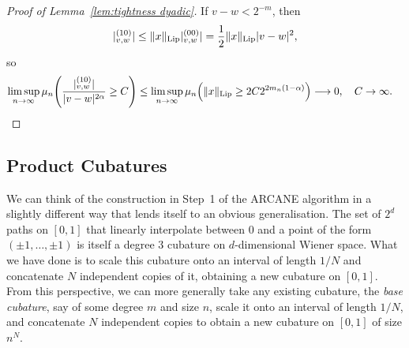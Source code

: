 \documentclass[11pt, letterpaper]{article}
\let\sig\relax
\DeclareMathOperator{\sig}{S}
\theoremstyle{definition}
\theoremstyle{remark}
\newcommand{\short}{ARCANE\xspace}
\begin{document}
\begin{appendices}
\begin{proof}[Proof of Lemma~\ref{lem:tightness dyadic}]
    If $v-w < 2^{-m}$, then 
    \begin{align*}
        |\sig^{(10)}_{v,w}| \le \|x\|_\text{Lip} |\sig^{(00)}_{v,w}| = \frac 12 \|x\|_\text{Lip} |v-w|^2,
    \end{align*}
    so
    \begin{align*}
        \limsup_{n\to \infty}\mu_n\Bigg(\frac{|\sig^{(10)}_{v,w}|}{|v-w|^{2\alpha}} \ge C\Bigg)
        &\le \limsup_{n\to \infty} \mu_n\Big( \|x\|_\text{Lip} \ge 2C 2^{2m_n(1-\alpha)}\Big) \longrightarrow 0,\quad C \to \infty.
    \end{align*}
\end{proof}

\subsection{Product Cubatures}
We can think of the construction in Step~1 of the \short algorithm in a slightly different way that lends itself to an obvious generalisation. The set of $2^d$ paths on $[0,1]$ that linearly interpolate between $0$ and a point of the form $(\pm 1,\ldots, \pm 1)$ is itself a degree $3$ cubature on $d$-dimensional Wiener space. What we have done is to scale this cubature onto an interval of length $1/N$ and concatenate $N$ independent copies of it, obtaining a new cubature on $[0,1]$. From this perspective, we can more generally take any existing cubature, the \emph{base cubature}, say of some degree $m$ and size $n$, scale it onto an interval of length $1/N$, and concatenate $N$ independent copies to obtain a new cubature on $[0,1]$ of size $n^N$.


\end{appendices}
\end{document}
